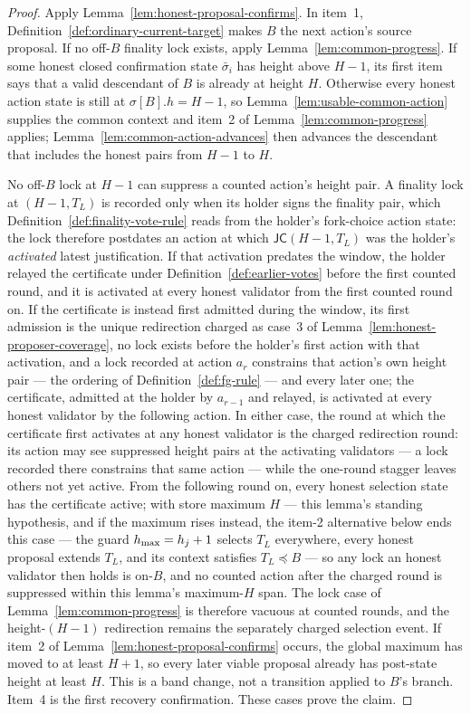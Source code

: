 \begin{proof}
Apply Lemma~\ref{lem:honest-proposal-confirms}.  In item~1,
Definition~\ref{def:ordinary-current-target} makes \(B\) the next action's
source proposal.  If no off-\(B\) finality lock exists,
apply Lemma~\ref{lem:common-progress}.  If some honest closed confirmation state \(\bar\sigma_i\) has
height above \(H-1\), its first item says that a valid
descendant of \(B\) is already at height \(H\).  Otherwise every honest action
state is still at \(\sigma[B].h=H-1\), so
Lemma~\ref{lem:usable-common-action} supplies the common context and item~2
of Lemma~\ref{lem:common-progress} applies;
Lemma~\ref{lem:common-action-advances} then advances the descendant that
includes the honest pairs from \(H-1\) to \(H\).

No off-\(B\) lock at \(H-1\) can suppress a counted action's height
pair.  A finality lock at \((H-1,T_L)\) is recorded only when its holder
signs the finality pair, which
Definition~\ref{def:finality-vote-rule} reads from the holder's
fork-choice action state: the lock therefore postdates an action at
which \(\mathsf{JC}(H-1,T_L)\) was the holder's \emph{activated} latest
justification.  If that activation predates the window, the holder
relayed the certificate under Definition~\ref{def:earlier-votes} before
the first counted round, and it is activated at every honest validator
from the first counted round on.  If the certificate is instead first
admitted during the window, its first admission is the unique
redirection charged as case~3 of
Lemma~\ref{lem:honest-proposer-coverage}, no lock exists before the
holder's first action with that activation, and a lock recorded at
action \(a_r\) constrains that action's own height pair --- the
ordering of Definition~\ref{def:fg-rule} --- and every later one; the
certificate, admitted at the holder by \(a_{r-1}\) and relayed, is
activated at every honest validator by the following action.  In either case, the round at which the certificate first activates at
any honest validator is the charged redirection round: its action may
see suppressed height pairs at the activating validators --- a lock
recorded there constrains that same action --- while the one-round
stagger leaves others not yet active.  From the following round on,
every honest selection state has the
certificate active; with store maximum \(H\) --- this lemma's standing
hypothesis, and if the maximum rises instead, the item-2 alternative
below ends this case --- the guard
\(h_{\max}=h_j+1\) selects \(T_L\) everywhere, every honest proposal
extends \(T_L\), and its context satisfies
\(T_L\preceq B\) --- so any lock an honest validator then holds is
on-\(B\), and no counted action after the charged round is
suppressed within this lemma's maximum-\(H\) span.  The lock case of Lemma~\ref{lem:common-progress} is
therefore vacuous at counted rounds, and the height-\((H-1)\)
redirection remains the
separately charged selection event.  If item~2 of
Lemma~\ref{lem:honest-proposal-confirms} occurs, the global maximum has moved
to at least \(H+1\), so every later viable proposal already has post-state
height at least \(H\).  This is a band change, not a transition applied to
\(B\)'s branch.  Item~4 is the first recovery confirmation.  These cases
prove the claim.
\end{proof}

